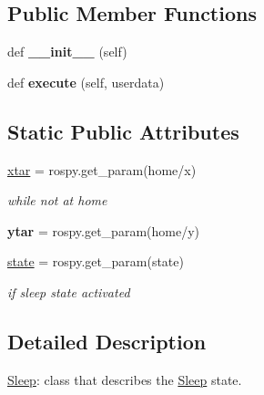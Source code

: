 \subsection*{Public Member Functions}
\begin{DoxyCompactItemize}
\item 
def {\bfseries \+\_\+\+\_\+init\+\_\+\+\_\+} (self)\hypertarget{classPet__behaviours_1_1Sleep_a4c496191e2c51bf2984208d180e1fd99}{}\label{classPet__behaviours_1_1Sleep_a4c496191e2c51bf2984208d180e1fd99}

\item 
def {\bfseries execute} (self, userdata)\hypertarget{classPet__behaviours_1_1Sleep_a952790c46209d96b95cb0c63de329b97}{}\label{classPet__behaviours_1_1Sleep_a952790c46209d96b95cb0c63de329b97}

\end{DoxyCompactItemize}
\subsection*{Static Public Attributes}
\begin{DoxyCompactItemize}
\item 
\hyperlink{classPet__behaviours_1_1Sleep_a643e30c580a0274a40c28847a1c9e445}{xtar} = rospy.\+get\+\_\+param(\textquotesingle{}home/x\textquotesingle{})\hypertarget{classPet__behaviours_1_1Sleep_a643e30c580a0274a40c28847a1c9e445}{}\label{classPet__behaviours_1_1Sleep_a643e30c580a0274a40c28847a1c9e445}

\begin{DoxyCompactList}\small\item\em while not at home \end{DoxyCompactList}\item 
{\bfseries ytar} = rospy.\+get\+\_\+param(\textquotesingle{}home/y\textquotesingle{})\hypertarget{classPet__behaviours_1_1Sleep_acff6bf9f7c507069469110129bce78fd}{}\label{classPet__behaviours_1_1Sleep_acff6bf9f7c507069469110129bce78fd}

\item 
\hyperlink{classPet__behaviours_1_1Sleep_a896626409cc2d477e99165f69de520de}{state} = rospy.\+get\+\_\+param(\textquotesingle{}state\textquotesingle{})
\begin{DoxyCompactList}\small\item\em if sleep state activated \end{DoxyCompactList}\end{DoxyCompactItemize}


\subsection{Detailed Description}
\hyperlink{classPet__behaviours_1_1Sleep}{Sleep}\+: class that describes the \hyperlink{classPet__behaviours_1_1Sleep}{Sleep} state. 

